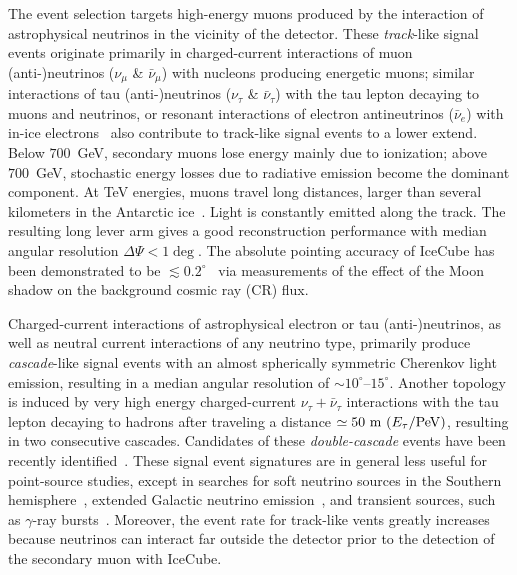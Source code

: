 \documentclass[aps,10pt,prd,twocolumn,floats,letterpaper,showpacs,nofootinbib,bibnotes,notitlepage,superscriptaddress,floatfix]{revtex4-1}
\begin{document}
The event selection targets high-energy muons produced by the interaction of astrophysical neutrinos in the vicinity of the detector. These \emph{track}-like signal events originate primarily in charged-current interactions of muon (anti-)neutrinos ($\nu_\mu$ \& $\bar{\nu}_\mu$) with nucleons producing energetic muons; similar interactions of tau (anti-)neutrinos ($\nu_\tau$ \& $\bar{\nu}_\tau$) with the tau lepton decaying to muons and neutrinos, or resonant interactions of electron antineutrinos ($\bar{\nu}_e$) with in-ice electrons~\cite{Glashow:1960zz} also contribute to track-like signal events to a lower extend. Below $700$~GeV, secondary muons lose energy mainly due to ionization; above $700$~GeV, stochastic energy losses due to radiative emission become the dominant component. At TeV energies, muons travel long distances, larger than several kilometers in the Antarctic ice~\cite{Chirkin:2004hz}. Light is constantly emitted along the track. The resulting long lever arm gives a good reconstruction performance with median angular resolution $\Delta\Psi<1\deg$. The absolute pointing accuracy of IceCube has been demonstrated to be $\lesssim0.2^\circ$~\cite{Aartsen:2013zka} via measurements of the effect of the Moon shadow on the background cosmic ray (CR) flux. 

Charged-current interactions of astrophysical electron or tau (anti-)neutrinos, as well as neutral current interactions of any neutrino type, primarily produce \emph{cascade}-like signal events with an almost spherically symmetric Cherenkov light emission, resulting in a median angular resolution of $\sim10^\circ$--$15^\circ$\cite{Aartsen:2017eiu}. Another topology is induced by very high energy charged-current $\nu_\tau+\bar{\nu}_\tau$ interactions with the tau lepton decaying to hadrons after traveling a distance $\simeq50~{\rm m}~(E_\tau/{\rm PeV})$, resulting in two consecutive cascades. Candidates of these \emph{double-cascade} events have been recently identified~\cite{Stachurska:2019wfb}. These signal event signatures are in general less useful for point-source studies, except in searches for soft neutrino sources in the Southern hemisphere~\cite{Aartsen:2019epb}, extended Galactic neutrino emission~\cite{Aartsen:2019epb}, and transient sources, such as $\gamma$-ray bursts~\cite{Aartsen:2016qcr}. Moreover, the event rate for track-like vents greatly increases because neutrinos can interact far outside the detector prior to the detection of the secondary muon with IceCube.  
\end{document}
